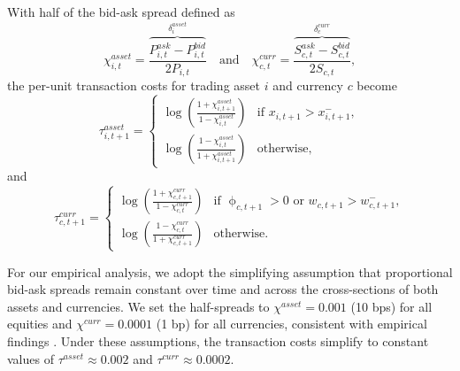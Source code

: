 With half of the bid-ask spread defined as
\begin{equation*}
\chi^{asset}_{i,t} = \frac{\overbrace{P^{ask}_{i,t} - P^{bid}_{i,t}}^{\delta_i^{asset}}}{2P_{i,t}} \quad \text{and} \quad \chi^{curr}_{c,t} = \frac{\overbrace{S^{ask}_{c,t} - S^{bid}_{c,t}}^{\delta_c^{curr}}}{2S_{c,t}},
\end{equation*}
the per-unit transaction costs for trading asset $i$ and currency $c$ become
\begin{equation*}
\tau^{asset}_{i,t+1} = 
\begin{cases}
\log \left( \frac{1 + \chi^{asset}_{i,t+1}}{1 - \chi^{asset}_{i,t}} \right) & \text{if } x_{i,t+1} > x^{-}_{i,t+1}, \\
\log \left( \frac{1 - \chi^{asset}_{i,t}}{1 + \chi^{asset}_{i,t+1}} \right) & \text{otherwise,}
\end{cases}
\end{equation*}
and
\begin{equation*}
\tau^{curr}_{c,t+1} =  
\begin{cases}
\log \left( \frac{1 + \chi^{curr}_{c,t+1}}{1 - \chi^{curr}_{c,t}} \right) & \text{if } \upphi_{c,t+1} > 0 \text{ or } w_{c,t+1} > w^{-}_{c,t+1}, \\
\log \left( \frac{1 - \chi^{curr}_{c,t}}{1 + \chi^{curr}_{c,t+1}} \right) & \text{otherwise.}
\end{cases}
\end{equation*}

For our empirical analysis, we adopt the simplifying assumption that proportional bid-ask spreads remain constant over time and across the cross-sections of both assets and currencies. We set the half-spreads to $\chi^{asset} = 0.001$ (10 bps) for all equities and $\chi^{curr} = 0.0001$ (1 bp) for all currencies, consistent with empirical findings \citep{FrazziniIsraelMoskowitz2018, Jones2002, MenkhoffSarnoSchmelingSchrimpf2012, NeelyWellerUlrich2009}. Under these assumptions, the transaction costs simplify to constant values of $\tau^{asset} \approx 0.002$ and $\tau^{curr} \approx 0.0002$. 
